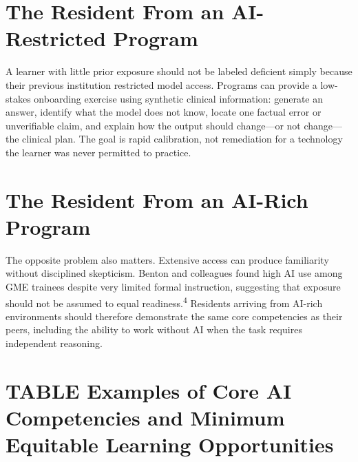 \documentclass[12pt]{article}
\begin{document}
\section*{The Resident From an AI-Restricted Program}

A learner with little prior exposure should not be labeled deficient simply
because their previous institution restricted model access. Programs can
provide a low-stakes onboarding exercise using synthetic clinical information:
generate an answer, identify what the model does not know, locate one factual
error or unverifiable claim, and explain how the output should change---or not
change---the clinical plan. The goal is rapid calibration, not remediation for
a technology the learner was never permitted to practice.

\section*{The Resident From an AI-Rich Program}

The opposite problem also matters. Extensive access can produce familiarity
without disciplined skepticism. Benton and colleagues found high AI use among
GME trainees despite very limited formal instruction, suggesting that exposure
should not be assumed to equal readiness.\textsuperscript{4} Residents arriving
from AI-rich environments should therefore demonstrate the same core
competencies as their peers, including the ability to work without AI when the
task requires independent reasoning.

\section*{TABLE \quad Examples of Core AI Competencies and Minimum Equitable Learning Opportunities}
\end{document}
